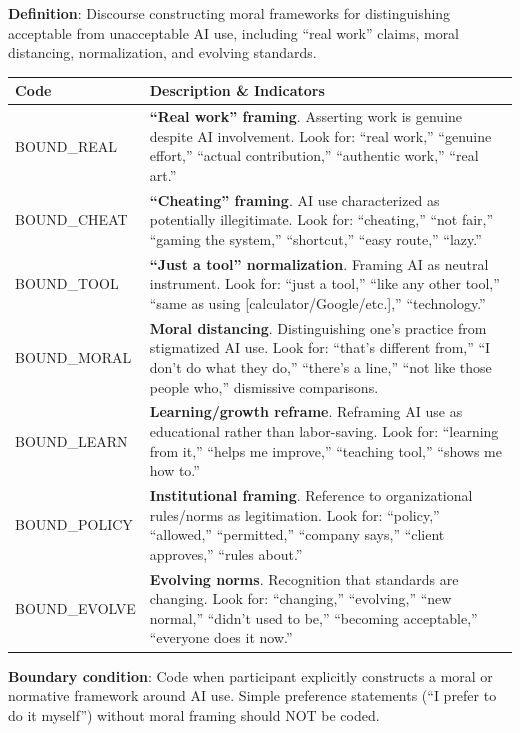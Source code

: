 \documentclass[11pt]{article}
\begin{document}
\begin{tcolorbox}[colback=boundarycolor!10, colframe=boundarycolor!80, title=\textbf{BOUND: Boundary Work and Legitimation Codes}, fonttitle=\bfseries\sffamily]

\textbf{Definition}: Discourse constructing moral frameworks for distinguishing acceptable from unacceptable AI use, including ``real work'' claims, moral distancing, normalization, and evolving standards.

\vspace{0.5em}
\begin{tabular}{@{}p{3.5cm}p{10cm}@{}}
\toprule
\textbf{Code} & \textbf{Description \& Indicators} \\
\midrule
BOUND\_REAL & \textbf{``Real work'' framing}. Asserting work is genuine despite AI involvement. Look for: ``real work,'' ``genuine effort,'' ``actual contribution,'' ``authentic work,'' ``real art.'' \\[0.5em]
BOUND\_CHEAT & \textbf{``Cheating'' framing}. AI use characterized as potentially illegitimate. Look for: ``cheating,'' ``not fair,'' ``gaming the system,'' ``shortcut,'' ``easy route,'' ``lazy.'' \\[0.5em]
BOUND\_TOOL & \textbf{``Just a tool'' normalization}. Framing AI as neutral instrument. Look for: ``just a tool,'' ``like any other tool,'' ``same as using [calculator/Google/etc.],'' ``technology.'' \\[0.5em]
BOUND\_MORAL & \textbf{Moral distancing}. Distinguishing one's practice from stigmatized AI use. Look for: ``that's different from,'' ``I don't do what they do,'' ``there's a line,'' ``not like those people who,'' dismissive comparisons. \\[0.5em]
BOUND\_LEARN & \textbf{Learning/growth reframe}. Reframing AI use as educational rather than labor-saving. Look for: ``learning from it,'' ``helps me improve,'' ``teaching tool,'' ``shows me how to.'' \\[0.5em]
BOUND\_POLICY & \textbf{Institutional framing}. Reference to organizational rules/norms as legitimation. Look for: ``policy,'' ``allowed,'' ``permitted,'' ``company says,'' ``client approves,'' ``rules about.'' \\[0.5em]
BOUND\_EVOLVE & \textbf{Evolving norms}. Recognition that standards are changing. Look for: ``changing,'' ``evolving,'' ``new normal,'' ``didn't used to be,'' ``becoming acceptable,'' ``everyone does it now.'' \\
\bottomrule
\end{tabular}

\vspace{0.5em}
\textbf{Boundary condition}: Code when participant explicitly constructs a moral or normative framework around AI use. Simple preference statements (``I prefer to do it myself'') without moral framing should NOT be coded.
\end{tcolorbox}
\end{document}
